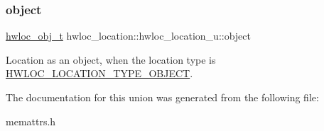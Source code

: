 \mbox{\label{a00318_acf2ebf75869f0a53a884ac2ab3374122}} 
\subsubsection{\texorpdfstring{object}{object}}
{\footnotesize\ttfamily \hyperlink{a00185_ga79b8ab56877ef99ac59b833203391c7d}{hwloc\+\_\+obj\+\_\+t} hwloc\+\_\+location\+::hwloc\+\_\+location\+\_\+u\+::object}



Location as an object, when the location type is \hyperlink{a00211_gga33099ba58f607fc70925da3777688586af637c39b23d48cff15ddb008644aaa84}{H\+W\+L\+O\+C\+\_\+\+L\+O\+C\+A\+T\+I\+O\+N\+\_\+\+T\+Y\+P\+E\+\_\+\+O\+B\+J\+E\+CT}. 



The documentation for this union was generated from the following file\+:\begin{DoxyCompactItemize}
\item 
memattrs.\+h\end{DoxyCompactItemize}
